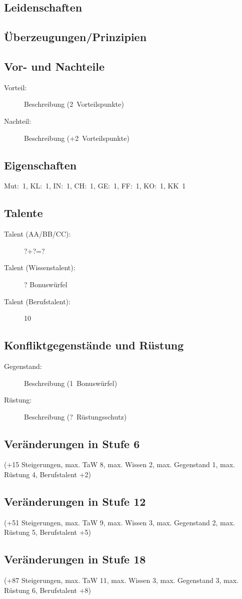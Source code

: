 \subsection{Leidenschaften}

\subsection{Überzeugungen/Prinzipien}

\subsection{Vor- und Nachteile}
\begin{description}
\item[Vorteil:] Beschreibung (2~Vorteilspunkte)
\item[Nachteil:] Beschreibung (+2~Vorteilspunkte)
\end{description}

\subsection{Eigenschaften}
Mut:~1, KL:~1, IN:~1, CH:~1, GE:~1, FF:~1, KO:~1, KK~1

\subsection{Talente}
\begin{description}
\item[Talent (AA/BB/CC):] ?+?=?
\item[Talent (Wissenstalent):] ? Bonuswürfel
\item[Talent (Berufstalent):] 10
\end{description}

\subsection{Konfliktgegenstände und Rüstung}
\begin{description}
\item[Gegenstand:] Beschreibung (1~Bonuswürfel)
\item[Rüstung:] Beschreibung (?~Rüstungsschutz)
\end{description}

\subsection{Veränderungen in Stufe 6}
(+15 Steigerungen, max. TaW 8, max. Wissen 2, max. Gegenstand 1, max. Rüstung 4, Berufstalent +2)

\subsection{Veränderungen in Stufe 12}
(+51 Steigerungen, max. TaW 9, max. Wissen 3, max. Gegenstand 2, max. Rüstung 5, Berufstalent +5)

\subsection{Veränderungen in Stufe 18}
(+87 Steigerungen, max. TaW 11, max. Wissen 3, max. Gegenstand 3, max. Rüstung 6, Berufstalent +8)




